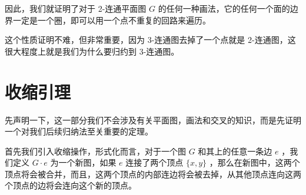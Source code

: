 \documentclass[11pt, a4paper]{ctexart}
\begin{document}
因此，我们就证明了对于 2-连通平面图 $G$ 的任何一种画法，它的任何一个面的边界一定是一个圈，即可以用一个点不重复的回路来遍历。

这个性质证明不难，但非常重要，因为 3-连通图去掉了一个点就是 2-连通图，这很大程度上就是我们为什么要归约到 3-连通图。

\section{收缩引理}

先声明一下，这一部分我们不会涉及有关平面图，画法和交叉的知识，而是先证明一个对我们后续归纳法至关重要的定理。

首先我们引入收缩操作，形式化而言，对于一个图 $G$ 和其上的任意一条边 $e$ ，我们定义 $G\cdot e$ 为一个新图，如果 $e$ 连接了两个顶点 $\{x,y\}$ ，那么在新图中，这两个顶点将会被合并，而且，这两个顶点的内部连边将会被去掉，从其他顶点连向这两个顶点的边将会连向这个新的顶点。
\end{document}
